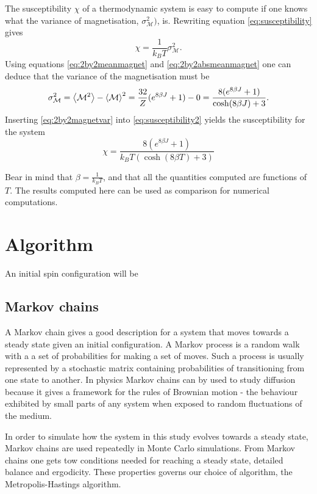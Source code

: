 \documentclass[10pt,a4paper]{amsart}
\begin{document}
The susceptibility $\chi$ of a thermodynamic system is easy to compute if one knows what the variance of magnetisation, $\sigma_{\mathcal{M}}^2)$, is. Rewriting equation \ref{eq:susceptibility} gives
\begin{equation}
\label{eq:susceptibility2}
\chi = \frac{1}{k_BT}\sigma_{\mathcal{M}}^2.
\end{equation}
Using equations \ref{eq:2by2meanmagnet} and \ref{eq:2by2absmeanmagnet} one can deduce that the variance of the magnetisation must be
\begin{equation}
\label{eq:2by2magnetvar}
\sigma_{\mathcal{M}}^2 = \ev{\mathcal{M}^2} - \ev{\mathcal{M}}^2 = \frac{32}{Z}(e^{8\beta J} +1) - 0 = \frac{8(e^{8\beta J} + 1)}{\cosh(8\beta J) + 3}.
\end{equation}
Inserting \ref{eq:2by2magnetvar} into \ref{eq:susceptibility2} yields the susceptibility for the system
\begin{equation}
\label{eq:2by2susceptibility}
\chi = \frac{8(e^{8\beta J}+1)}{k_BT(\cosh(8\beta T) + 3)}
\end{equation}

Bear in mind that $\beta = \frac{1}{k_BT}$, and that all the quantities computed are functions of $T$. The results computed here can be used as comparison for numerical computations.

\section{Algorithm}
An initial spin configuration will be 

\subsection{Markov chains}
A Markov chain gives a good description for a system that moves towards a steady state given an initial configuration. A Markov process is a random walk with a a set of probabilities for making a set of moves. Such a process is usually represented by a stochastic matrix containing probabilities of transitioning from one state to another. In physics Markov chains can by used to study diffusion because it gives a framework for the rules of Brownian motion - the behaviour exhibited by small parts of any system when exposed to random fluctuations of the medium.

In order to simulate how the system in this study evolves towards a steady state, Markov chains are used repeatedly in Monte Carlo simulations. From Markov chains one gets tow conditions needed for reaching a steady state, detailed balance and ergodicity. These properties governs our choice of algorithm, the Metropolis-Hastings algorithm.
\end{document}
